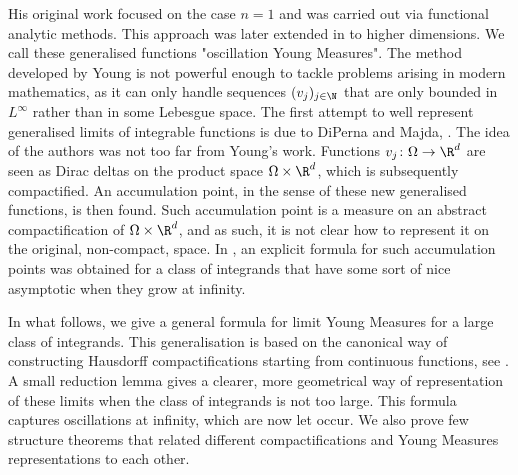 His original work focused on the case $n=1$ and was carried out via functional analytic methods. This approach was later extended in \cite{ball1989version,berliocchi1973integrandes} to higher dimensions. We call these generalised functions "oscillation Young Measures". The method developed by Young is not powerful enough to tackle problems arising in modern mathematics, as it can only handle sequences $(v_j)_{j\in\N}$ that are only bounded in $L^\infty$ rather than in some Lebesgue space. The first attempt to well represent generalised limits of integrable functions is due to DiPerna and Majda, \cite{diperna1987oscillations}. The idea of the authors was not too far from Young's work. Functions $v_j\colon \Omega\to \R^d$ are seen as Dirac deltas on the product space $\Omega\times \R^d$, which is subsequently compactified. An accumulation point, in the sense of these new generalised functions, is then found. Such accumulation point is a measure on an abstract compactification of $\Omega\times \R^d$, and as such, it is not clear how to represent it on the original, non-compact, space. In \cite{alibert1997non}, an explicit formula for such accumulation points was obtained for a class of integrands that have some sort of nice asymptotic when they grow at infinity.

In what follows, we give a general formula for limit Young Measures for a large class of integrands. This generalisation is based on the canonical way of constructing Hausdorff compactifications starting from continuous functions, see \cite{chandler1976hausdorff}. A small reduction lemma gives a clearer, more geometrical way of representation of these limits when the class of integrands is not too large. This formula captures oscillations at infinity, which are now let occur. We also prove few structure theorems that related different compactifications and Young Measures representations to each other. \\

